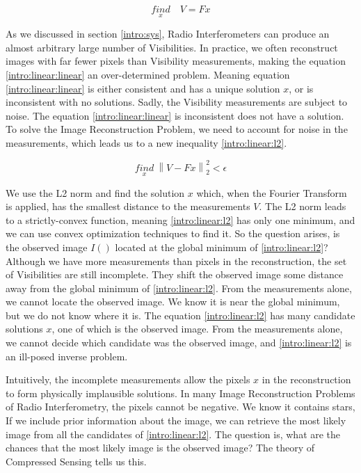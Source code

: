 \begin{equation}\label{intro:linear:linear}
\underset{x}{find}\quad V = Fx
\end{equation}

As we discussed in section \ref{intro:sys}, Radio Interferometers can produce an almost arbitrary large number of Visibilities. In practice, we often reconstruct images with far fewer pixels than Visibility measurements, making the equation \eqref{intro:linear:linear} an over-determined problem. Meaning equation \eqref{intro:linear:linear} is either consistent and has a unique solution $x$, or is inconsistent with no solutions. Sadly, the Visibility measurements are subject to noise. The equation \eqref{intro:linear:linear} is inconsistent does not have a solution. To solve the Image Reconstruction Problem, we need to account for noise in the measurements, which leads us to a new inequality \eqref{intro:linear:l2}.

\begin{equation}\label{intro:linear:l2}
\underset{x}{find} \: \left \| V - Fx \right \|_2^2 < \epsilon
\end{equation}

We use the L2 norm and find the solution $x$ which, when the Fourier Transform is applied, has the smallest distance to the measurements $V$. The L2 norm leads to a strictly-convex function, meaning \eqref{intro:linear:l2} has only one minimum, and we can use convex optimization techniques to find it. So the question arises, is the observed image $I()$ located at the global minimum of \eqref{intro:linear:l2}? Although we have more measurements than pixels in the reconstruction, the set of Visibilities are still incomplete. They shift the observed image some distance away from the global minimum of \eqref{intro:linear:l2}. From the measurements alone, we cannot locate the observed image. We know it is near the global minimum, but we do not know where it is. The equation \eqref{intro:linear:l2} has many candidate solutions $x$, one of which is the observed image.  From the measurements alone, we cannot decide which candidate was the observed image, and \eqref{intro:linear:l2} is an ill-posed inverse problem. 

Intuitively, the incomplete measurements allow the pixels $x$ in the reconstruction to form physically implausible solutions. 
In many Image Reconstruction Problems of Radio Interferometry, the pixels cannot be negative. We know it contains stars, 
 If we include prior information about the image, we can retrieve the most likely image from all the candidates of \eqref{intro:linear:l2}.
The question is, what are the chances that the most likely image is the observed image?
The theory of Compressed Sensing tells us this.

